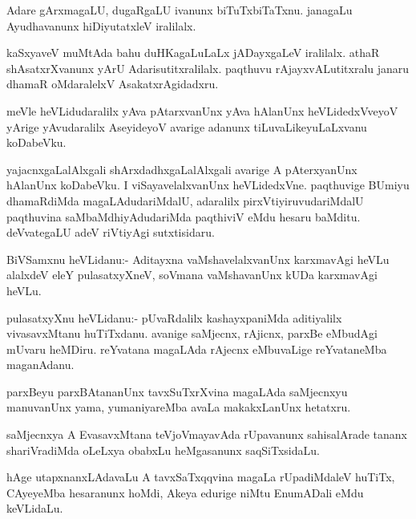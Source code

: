\documentclass{article}
\begin{document}
\begin{mn}
Adare gArxmagaLU, dugaRgaLU ivanunx biTuTxbiTaTxnu. janagaLu
Ayudhavanunx hiDiyutatxleV iralilalx.
\end{mn}

\begin{mn}
kaSxyaveV muMtAda bahu duHKagaLuLaLx jADayxgaLeV iralilalx. athaR
shAsatxrXvanunx yArU Adarisutitxralilalx. paqthuvu rAjayxvALutitxralu
janaru dhamaR oMdaralelxV AsakatxrAgidadxru.
\end{mn}

\begin{mn}
meVle heVLidudaralilx yAva pAtarxvanUnx yAva hAlanUnx heVLidedxVveyoV
yArige yAvudaralilx AseyideyoV avarige adanunx tiLuvaLikeyuLaLxvanu koDabeVku.
\end{mn}

\begin{mn}%
yajacnxgaLalAlxgali shArxdadhxgaLalAlxgali avarige A pAterxyanUnx
hAlanUnx koDabeVku. I viSayavelalxvanUnx heVLidedxVne. paqthuvige
BUmiyu dhamaRdiMda magaLAdudariMdalU, adaralilx pirxVtiyiruvudariMdalU
paqthuvina saMbaMdhiyAdudariMda paqthiviV eMdu hesaru
baMditu. deVvategaLU adeV riVtiyAgi sutxtisidaru.
\end{mn}

\begin{mn}
BiVSamxnu heVLidanu:- Aditayxna vaMshavelalxvanUnx karxmavAgi heVLu
alalxdeV eleY pulasatxyXneV, soVmana vaMshavanUnx kUDa karxmavAgi heVLu.
\end{mn}

\begin{mn}%
pulasatxyXnu heVLidanu:- pUvaRdalilx kashayxpaniMda aditiyalilx
vivasavxMtanu huTiTxdanu. avanige saMjecnx, rAjicnx, parxBe eMbudAgi
mUvaru heMDiru. reYvatana magaLAda rAjecnx eMbuvaLige reYvataneMba maganAdanu.
\end{mn}

\begin{mn}
parxBeyu parxBAtananUnx tavxSuTxrXvina magaLAda saMjecnxyu manuvanUnx
yama, yumaniyareMba avaLa makakxLanUnx hetatxru.
\end{mn}

\begin{mn}%
saMjecnxya A EvasavxMtana teVjoVmayavAda rUpavanunx sahisalArade
tananx shariVradiMda oLeLxya obabxLu heMgasanunx saqSiTxsidaLu.
\end{mn}

\begin{mn}
hAge utapxnanxLAdavaLu A tavxSaTxqqvina magaLa rUpadiMdaleV huTiTx,
CAyeyeMba hesaranunx hoMdi, Akeya edurige niMtu EnumADali eMdu keVLidaLu.
\end{mn}
\end{document}
